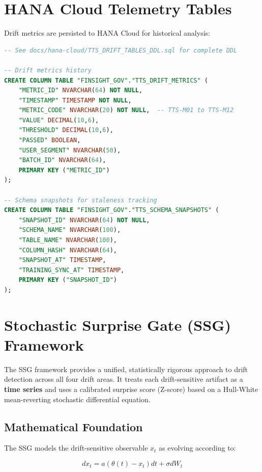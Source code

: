 \section{HANA Cloud Telemetry Tables}

Drift metrics are persisted to HANA Cloud for historical analysis:

\begin{lstlisting}[language=sql,caption={TTS Drift telemetry tables}]
-- See docs/hana-cloud/TTS_DRIFT_TABLES_DDL.sql for complete DDL

-- Drift metrics history
CREATE COLUMN TABLE "FINSIGHT_GOV"."TTS_DRIFT_METRICS" (
    "METRIC_ID" NVARCHAR(64) NOT NULL,
    "TIMESTAMP" TIMESTAMP NOT NULL,
    "METRIC_CODE" NVARCHAR(20) NOT NULL,  -- TTS-M01 to TTS-M12
    "VALUE" DECIMAL(10,6),
    "THRESHOLD" DECIMAL(10,6),
    "PASSED" BOOLEAN,
    "USER_SEGMENT" NVARCHAR(50),
    "BATCH_ID" NVARCHAR(64),
    PRIMARY KEY ("METRIC_ID")
);

-- Schema snapshots for staleness tracking
CREATE COLUMN TABLE "FINSIGHT_GOV"."TTS_SCHEMA_SNAPSHOTS" (
    "SNAPSHOT_ID" NVARCHAR(64) NOT NULL,
    "SCHEMA_NAME" NVARCHAR(100),
    "TABLE_NAME" NVARCHAR(100),
    "COLUMN_HASH" NVARCHAR(64),
    "SNAPSHOT_AT" TIMESTAMP,
    "TRAINING_SYNC_AT" TIMESTAMP,
    PRIMARY KEY ("SNAPSHOT_ID")
);
\end{lstlisting}

\section{Stochastic Surprise Gate (SSG) Framework}
\label{sec:ssg-framework}

The SSG framework provides a unified, statistically rigorous approach to drift detection
across all four drift areas. It treats each drift-sensitive artifact as a \textbf{time series}
and uses a calibrated surprise score (Z-score) based on a Hull-White mean-reverting
stochastic differential equation.

\subsection{Mathematical Foundation}

The SSG models the drift-sensitive observable $x_t$ as evolving according to:

\begin{equation}
\boxed{
dx_t = a(\theta(t) - x_t)dt + \sigma dW_t
}
\label{eq:hull-white-sde}
\end{equation}

